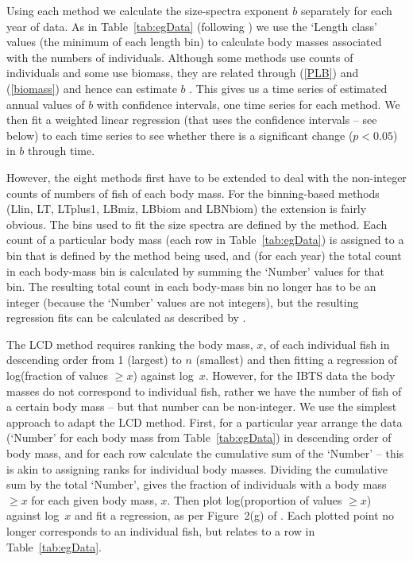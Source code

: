 \documentclass[12pt, letter]{article}
\newcommand{\MEE}{erpbb17}     %
\begin{document}
Using each method we calculate the size-spectra exponent $b$ separately for
each year
of data.
As in Table~\ref{tab:egData} (following \citealt{ffrr12}) we use the
`Length class' values (the minimum of each length bin) to calculate body masses
associated with the numbers of individuals.
Although some methods use counts of individuals and some use biomass,
they are related through (\ref{PLB}) and (\ref{biomass}) and hence can estimate
$b$ \citep{\MEE}. This gives us a time series of estimated annual values of $b$
with confidence intervals, one time series for each method. We then fit a
weighted linear regression (that uses the confidence intervals -- see below)
to each time series to see whether there is a
significant change ($p < 0.05$) in $b$ through time.

However, the eight methods first have to be extended to deal with
the non-integer counts of numbers of fish of each body mass. For the
binning-based methods (Llin, LT, LTplus1, LBmiz, LBbiom and LBNbiom) the
extension is fairly obvious. The bins used to fit the size spectra are defined
by the method.
Each count of a particular body mass (each row in Table~\ref{tab:egData}) is
assigned to a bin that is defined by the method being used, and (for each year)
the total count in each body-mass bin is calculated by summing the `Number'
values for that bin. The resulting total count in each body-mass bin no longer
has to be an integer (because the `Number' values are not integers), but the
resulting regression fits can be calculated as described by \citet{\MEE}.

The LCD method requires ranking the body mass, $x$, of each individual fish in
descending order from 1 (largest) to $n$ (smallest) and then fitting a
regression of log(fraction of values $\geq x$) against log~$x$. However, for the
IBTS data the body masses do not correspond to individual fish, rather we have
the number of fish of a certain body mass -- but that number can be
non-integer. We use the simplest approach to adapt the LCD method. First, for a
particular year arrange the data (`Number' for each body mass from
Table~\ref{tab:egData}) in descending order of body mass, and for each row
calculate the cumulative sum of the `Number' -- this is akin to assigning ranks
for individual body masses. Dividing the cumulative sum by the total `Number',
gives the fraction of individuals with a body mass $\geq x$ for each given body
mass, $x$. Then plot log(proportion of values $\geq x$) against log~$x$ and fit
a regression, as per Figure~2(g) of \citet{\MEE}. Each plotted point no longer
corresponds to an individual fish, but relates to a row in
Table~\ref{tab:egData}.
\end{document}

